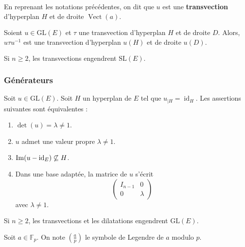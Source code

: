 	\begin{definition}
		En reprenant les notations précédentes, on dit que $u$ est une \textbf{transvection} d'hyperplan $H$ et de droite $\operatorname{Vect}(a)$.
	\end{definition}

	\begin{proposition}
		Soient $u \in \mathrm{GL}(E)$ et $\tau$ une transvection d'hyperplan $H$ et de droite $D$. Alors, $u \tau u^{-1}$ est une transvection d'hyperplan $u(H)$ et de droite $u(D)$.
	\end{proposition}

	\begin{theorem}
		Si $n \geq 2$, les transvections engendrent $\mathrm{SL}(E)$.
	\end{theorem}

	\subsubsection{Générateurs}

	\begin{proposition}
		Soit $u \in \mathrm{GL}(E)$. Soit $H$ un hyperplan de $E$ tel que $u_{|H} = \operatorname{id}_H$. Les assertions suivantes sont équivalentes :
		\begin{enumerate}[label=(\roman*)]
			\item $\det(u) = \lambda \neq 1$.
			\item $u$ admet une valeur propre $\lambda \neq 1$.
			\item $\mathrm{Im}(u - \operatorname{id}_E) \not\subseteq H$.
			\item Dans une base adaptée, la matrice de $u$ s'écrit
			\[
				\begin{pmatrix}
					I_{n-1} & 0 \\
					0 & \lambda
				\end{pmatrix}
			\]
			avec $\lambda \neq 1$.
		\end{enumerate}
	\end{proposition}

	\begin{theorem}
		Si $n \geq 2$, les transvections et les dilatations engendrent $\mathrm{GL}(E)$.
	\end{theorem}


	\begin{notation}
		Soit $a \in \mathbb{F}_p$. On note $\left( \frac{a}{p} \right)$ le symbole de Legendre de $a$ modulo $p$.
	\end{notation}

